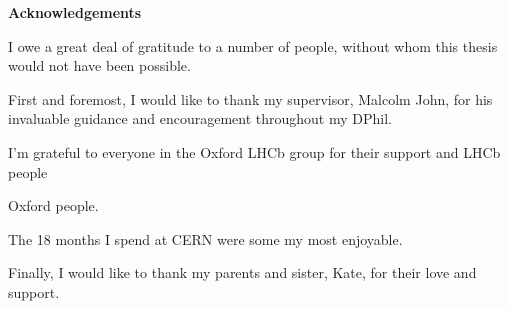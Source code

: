 %
%
%


\begin{alwayssingle} 
    \thispagestyle{empty}
    \begin{center}
        \vspace*{1.5cm}
        {\Large \bfseries Acknowledgements}
    \end{center}
    \vspace{0.5cm}
    I owe a great deal of gratitude to a number of people, without whom this thesis would not have been possible.

    First and foremost, I would like to thank my supervisor, Malcolm John, for his invaluable guidance and encouragement throughout my DPhil.  

    I'm grateful to everyone in the Oxford LHCb group for their support and 
    LHCb people

    
    Oxford people. 

    The 18 months I spend at CERN were some my most enjoyable. 

    Finally, I would like to thank my parents and sister, Kate, for their love and support.   


\end{alwayssingle}
